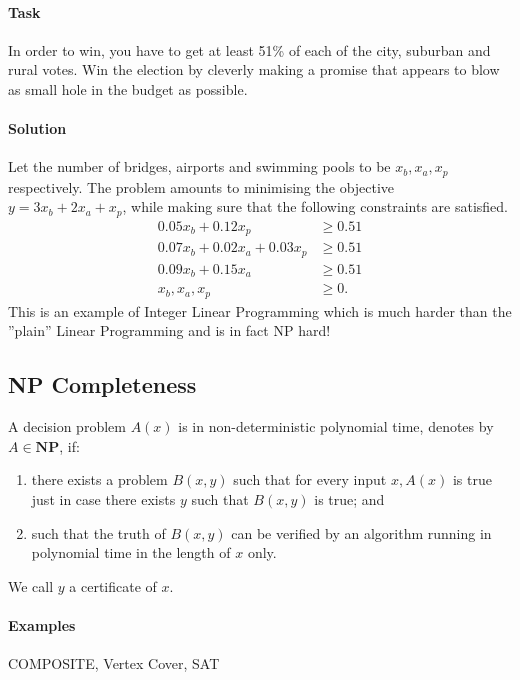 \paragraph{Task} 
In order to win, you have to get at least 51\% of each of the city, suburban and rural votes. Win the election by cleverly making a promise that appears to blow as small hole in the budget as possible. 

\paragraph{Solution}
Let the number of bridges, airports and swimming pools to be \(x_b, x_a, x_p\) respectively.
The problem amounts to minimising the objective \(y = 3x_b + 2x_a + x_p\), while making sure that the following constraints are satisfied. 
\begin{align*}
    0.05 x_b + 0.12x_p & \geq 0.51 \tag{securing majority of city votes} \\
    0.07 x_b + 0.02x_a + 0.03x_p & \geq 0.51 \tag{securing majority of suburban votes} \\ 
    0.09 x_b + 0.15x_a & \geq 0.51 \tag{securing majority of rural votes} \\
    x_b, x_a, x_p & \geq 0. 
\end{align*}
This is an example of Integer Linear Programming which is much harder than the ''plain'' Linear Programming and is in fact NP hard!

\subsection{NP Completeness}
A decision problem \(A(x)\) is in non-deterministic polynomial time, denotes by \(A\in\textbf{NP}\), if:
\begin{enumerate}
    \item there exists a problem \(B(x,y)\) such that for every input \(x, A(x)\) is true just in case there exists \(y\) such that \(B(x,y)\) is true; and
    \item such that the truth of \(B(x,y)\) can be verified by an algorithm running in polynomial time in the length of \(x\) only.
\end{enumerate}
We call \(y\) a certificate of \(x\).

\paragraph{Examples}
COMPOSITE, Vertex Cover, SAT

